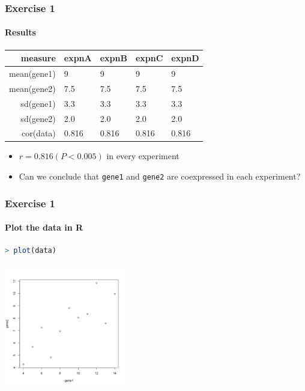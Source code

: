 \begin{frame}
  \frametitle{Exercise 1}
  \framesubtitle{Results}
  \begin{center}
  \begin{tabular}{r|l|l|l|l}
	  measure & expnA & expnB & expnC & expnD \\
	  \hline
	  mean(gene1) & 9     & 9     & 9     & 9 \\
	  mean(gene2) & 7.5   & 7.5   & 7.5   & 7.5 \\
  	  sd(gene1)   & 3.3   & 3.3   & 3.3   & 3.3 \\
  	  sd(gene2)   & 2.0   & 2.0   & 2.0   & 2.0 \\  
	  cor(data)   & 0.816 & 0.816 & 0.816 & 0.816 \\  
  \end{tabular}
  \end{center}
  \begin{itemize}
     \item<2-> $r=0.816 (P<0.005)$ in every experiment
     \item<2-> Can we conclude that \texttt{gene1} and \texttt{gene2} are coexpressed in each experiment?
  \end{itemize}
\end{frame}

\begin{frame}[fragile]
  \frametitle{Exercise 1}
  \framesubtitle{Plot the data in R}
\begin{lstlisting}[language=R]
> plot(data)
\end{lstlisting}
  \includegraphics[width=0.4\textwidth]{images/ex1_screenshot_d}        
\end{frame}

